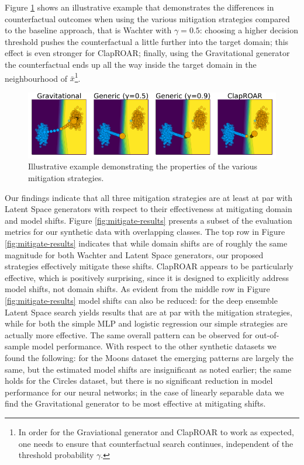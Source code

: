 \documentclass[conference,final,]{IEEEtran}
\begin{document}
Figure \ref{fig:mitigation} shows an illustrative example that demonstrates the differences in counterfactual outcomes when using the various mitigation strategies compared to the baseline approach, that is Wachter with \(\gamma=0.5\): choosing a higher decision threshold pushes the counterfactual a little further into the target domain; this effect is even stronger for ClapROAR; finally, using the Gravitational generator the counterfactual ends up all the way inside the target domain in the neighbourhood of \(\bar{x}\)\footnote{In order for the Graviational generator and ClapROAR to work as expected, one needs to ensure that counterfactual search continues, independent of the threshold probability \(\gamma\).}.

\begin{figure}

{\centering \includegraphics[width=0.9\linewidth]{www/mitigation} 

}

\caption{Illustrative example demonstrating the properties of the various mitigation strategies.}\label{fig:mitigation}
\end{figure}

Our findings indicate that all three mitigation strategies are at least at par with Latent Space generators with respect to their effectiveness at mitigating domain and model shifts. Figure \ref{fig:mitigate-results} presents a subset of the evaluation metrics for our synthetic data with overlapping classes. The top row in Figure \ref{fig:mitigate-results} indicates that while domain shifts are of roughly the same magnitude for both Wachter and Latent Space generators, our proposed strategies effectively mitigate these shifts. ClapROAR appears to be particularly effective, which is positively surprising, since it is designed to explicitly address model shifts, not domain shifts. As evident from the middle row in Figure \ref{fig:mitigate-results} model shifts can also be reduced: for the deep ensemble Latent Space search yields results that are at par with the mitigation strategies, while for both the simple MLP and logistic regression our simple strategies are actually more effective. The same overall pattern can be observed for out-of-sample model performance. With respect to the other synthetic datasets we found the following: for the Moons dataset the emerging patterns are largely the same, but the estimated model shifts are insignificant as noted earlier; the same holds for the Circles dataset, but there is no significant reduction in model performance for our neural networks; in the case of linearly separable data we find the Gravitational generator to be most effective at mitigating shifts.
\end{document}
